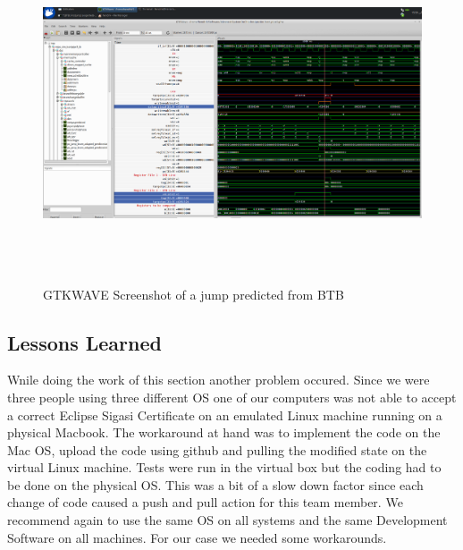\begin{figure}
	\centering
	\includegraphics[width=1\textwidth, height=10cm, keepaspectratio]{pictures/BTB_SecondJump}
	\caption{GTKWAVE Screenshot of a jump predicted from BTB}
	\label{fig5-4}
\end{figure}




\subsection{Lessons Learned}
Wnile doing the work of this section another problem occured. Since we were three people using three different OS one of our computers was not able to accept a correct Eclipse Sigasi Certificate on an emulated Linux machine running on a physical Macbook. The workaround at hand was to implement the code on the Mac OS, upload the code using github and pulling the modified  state on the virtual Linux machine. Tests were run in the virtual box but the coding had to be done on the physical OS. This was a bit of a slow down factor since each change of code caused a push and pull action for this team member. We recommend again to use the same OS on all systems and the same Development Software on all machines. For our case we needed some workarounds.
